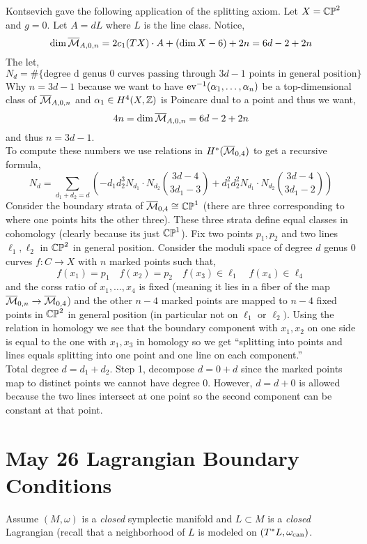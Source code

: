\documentclass[12pt]{article}
\begin{document}
Kontsevich gave the following application of the splitting axiom. Let $X = \mathbb{CP}^2$ and $g = 0$. Let $A = d L$ where $L$ is the line class. Notice,
\[ \dim{\overline{\mathcal{M}}_{A,0,n}} = 2 c_1(TX) \cdot A + (\dim{X} - 6) + 2n = 6 d  - 2 + 2n \]
The let,
\[ N_d = \# \{ \text{degree d genus 0 curves passing through } 3 d - 1 \text{ points in general position} \} \]
Why $n = 3d - 1$ because we want to have $\mathrm{ev}^{-1}(\alpha_1, \dots, \alpha_n)$ be a top-dimensional class of $\overline{\mathcal{M}}_{A,0,n}$ and $\alpha_1 \in H^4(X, \mathbb{Z})$ is Poincare dual to a point and thus we want,
\[ 4 n = \dim{\overline{\mathcal{M}}_{A,0,n}} = 6 d - 2 + 2n \]
and thus $n = 3d - 1$. 
\bigskip\\
To compute these numbers we use relations in $H^*(\overline{\mathcal{M}}_{0,4})$ to get a recursive formula,
\[ N_d = \sum_{d_1 + d_2 = d} \left( -d_1 d_2^3 N_{d_1} \cdot N_{d_2} {3 d - 4 \choose 3 d_1 - 3} + d_1^2 d_2^2  N_{d_1} \cdot N_{d_2} { 3 d - 4 \choose 3 d_1 - 2} \right) \]
Consider the boundary strata of $\overline{\mathcal{M}}_{0,4} \cong \mathbb{CP}^1$ (there are three corresponding to where one points hits the other three). These three strata define equal classes in cohomology (clearly because its just $\mathbb{CP}^1$). Fix two points $p_1, p_2$ and two lines $\ell_1, \ell_2$ in $\mathbb{CP}^2$ in general position. Consider the moduli space of degree $d$ genus $0$ curves $f : C \to X$ with $n$ marked points such that,
\[ f(x_1) = p_1 \quad f(x_2) = p_2 \quad f(x_3) \in \ell_1 \quad f(x_4) \in \ell_4 \]
and the corss ratio of $x_1, \dots, x_4$ is fixed (meaning it lies in a fiber of the map $\overline{\mathcal{M}}_{0,n} \to \overline{\mathcal{M}}_{0,4}$) and the other $n - 4$ marked points are mapped to $n - 4$ fixed points in $\mathbb{CP}^2$ in general position (in particular not on $\ell_1$ or $\ell_2)$. Using the relation in homology we see that the boundary component with $x_1, x_2$ on one side is equal to the one with $x_1, x_3$ in homology so we get ``splitting into points and lines equals splitting into one point and one line on each component.''
\bigskip\\
Total degree $d = d_1 + d_2$. Step 1, decompose $d = 0 + d$ since the marked points map to distinct points we cannot have degree $0$. However, $d = d + 0$ is allowed because the two lines intersect at one point so the second component can be constant at that point. 

\section{May 26 Lagrangian Boundary Conditions}

Assume $(M, \omega)$ is a \textit{closed} symplectic manifold and $L \subset M$ is a \textit{closed} Lagrangian (recall that a neighborhood of $L$ is modeled on $(T^* L, \omega_{\text{can}})$. 
\end{document}

